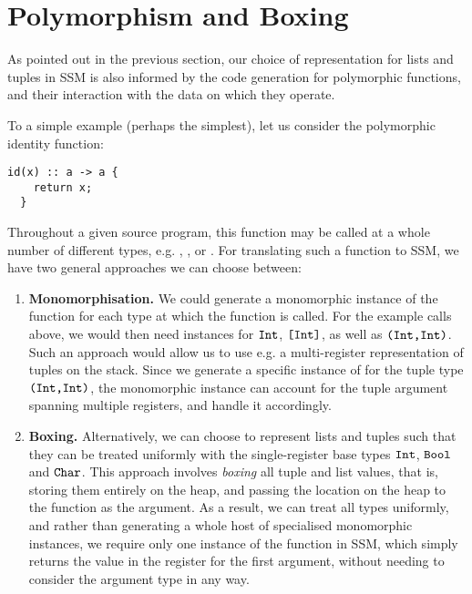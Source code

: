 \section{Polymorphism and Boxing} \label{sec:polymorphism-boxing}

As pointed out in the previous section, our choice of representation for lists
and tuples in SSM is also informed by the code generation for polymorphic
functions, and their interaction with the data on which they operate.

To a simple example (perhaps the simplest), let us consider the polymorphic
identity function:
\begin{lstlisting}[language=spl]
  id(x) :: a -> a {
    return x;
  }
\end{lstlisting}
%
Throughout a given source program, this function may be called at a whole number
of different types, e.g. , , or . For
translating such a function to SSM, we have two general approaches we can choose
between:
\begin{enumerate}[label={(\arabic*)}]
  \item \textbf{Monomorphisation.} We could generate a monomorphic instance of
        the  function for each type at which the function is called. For
        the example calls above, we would then need instances for $\texttt{Int}$,
        $\texttt{[}\texttt{Int}\texttt{]}$, as well as $\texttt{(}\texttt{Int}\texttt{,}\texttt{Int}\texttt{)}$.
        Such an approach would allow us to use e.g. a multi-register
        representation of tuples on the stack. Since we generate a specific
        instance of  for the tuple type $\texttt{(}\texttt{Int}\texttt{,}\texttt{Int}\texttt{)}$, the
        monomorphic instance can account for the tuple argument spanning
        multiple registers, and handle it accordingly.
  \item \textbf{Boxing.} Alternatively, we can choose to represent lists and
        tuples such that they can be treated uniformly with the single-register
        base types $\texttt{Int}$, $\texttt{Bool}$ and $\texttt{Char}$.
        This approach involves \emph{boxing} all tuple and list values, that is,
        storing them entirely on the heap, and passing the location on the heap
        to the function as the argument.
        As a result, we can treat all types uniformly, and rather than
        generating a whole host of specialised monomorphic instances, we require
        only one instance of the  function in SSM, which simply returns
        the value in the register for the first argument, without needing to
        consider the argument type in any way.
\end{enumerate}

